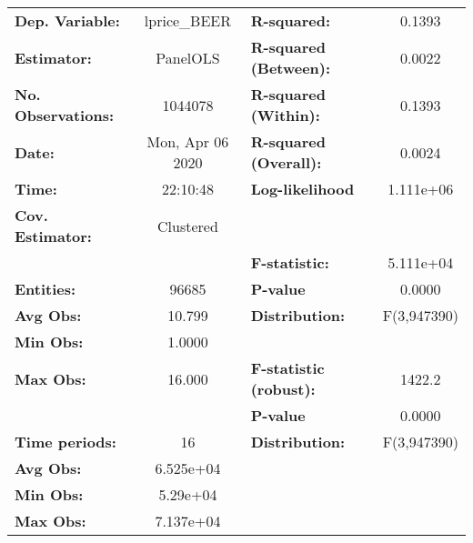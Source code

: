 \documentclass{report}a
\begin{document}
\begin{center}
\begin{tabular}{lclc}
\toprule
\textbf{Dep. Variable:}       &    lprice\_BEER    & \textbf{  R-squared:         }   &      0.1393      \\
\textbf{Estimator:}           &      PanelOLS      & \textbf{  R-squared (Between):}  &      0.0022      \\
\textbf{No. Observations:}    &      1044078       & \textbf{  R-squared (Within):}   &      0.1393      \\
\textbf{Date:}                &  Mon, Apr 06 2020  & \textbf{  R-squared (Overall):}  &      0.0024      \\
\textbf{Time:}                &      22:10:48      & \textbf{  Log-likelihood     }   &    1.111e+06     \\
\textbf{Cov. Estimator:}      &     Clustered      & \textbf{                     }   &                  \\
\textbf{}                     &                    & \textbf{  F-statistic:       }   &    5.111e+04     \\
\textbf{Entities:}            &       96685        & \textbf{  P-value            }   &      0.0000      \\
\textbf{Avg Obs:}             &       10.799       & \textbf{  Distribution:      }   &   F(3,947390)    \\
\textbf{Min Obs:}             &       1.0000       & \textbf{                     }   &                  \\
\textbf{Max Obs:}             &       16.000       & \textbf{  F-statistic (robust):} &      1422.2      \\
\textbf{}                     &                    & \textbf{  P-value            }   &      0.0000      \\
\textbf{Time periods:}        &         16         & \textbf{  Distribution:      }   &   F(3,947390)    \\
\textbf{Avg Obs:}             &     6.525e+04      & \textbf{                     }   &                  \\
\textbf{Min Obs:}             &      5.29e+04      & \textbf{                     }   &                  \\
\textbf{Max Obs:}             &     7.137e+04      & \textbf{                     }   &                  \\
\bottomrule
\end{tabular}
\begin{tabular}{lcccccc}

\end{tabular}
\end{center}
\end{document}
